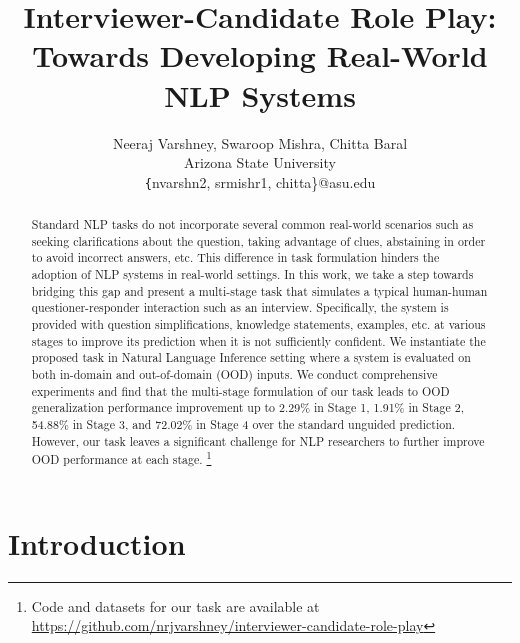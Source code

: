 \documentclass[11pt,a4paper]{article}
\title{Interviewer-Candidate Role Play: Towards Developing Real-World NLP Systems}
\author{
        Neeraj Varshney, 
        Swaroop Mishra, 
        Chitta Baral 
\\Arizona State University \\
    \texttt\{nvarshn2, srmishr1, chitta\}@asu.edu
}
\date{}
\providecommand{\Swaroop}[1]{
    {\protect\color{red}{[Swaroop: #1]}}
}
\begin{document}
\maketitle
\begin{abstract}

Standard NLP tasks do not incorporate several common real-world scenarios such as seeking clarifications about the question, taking advantage of clues, abstaining in order to avoid incorrect answers, etc. 
This difference in task formulation hinders the adoption of NLP systems in real-world settings.
In this work, we take a step towards bridging this gap and present a multi-stage task that simulates a typical human-human questioner-responder interaction such as an interview.
Specifically, the system is provided with question simplifications, knowledge statements, examples, etc. at various stages to improve its prediction when it is not sufficiently confident.
We instantiate the proposed task in Natural Language Inference setting where a system is evaluated on both in-domain and out-of-domain (OOD) inputs.
We conduct comprehensive experiments and find that the multi-stage formulation of our task leads to OOD generalization performance improvement up to 2.29\% in Stage 1, 1.91\% in Stage 2, 54.88\% in Stage 3, and 72.02\% in Stage 4 over the standard unguided prediction.
However, our task leaves a significant challenge for NLP researchers to further improve OOD performance at each stage.
\footnote{Code and datasets for our task are available at  \href{https://github.com/nrjvarshney/interviewer-candidate-role-play}{https://github.com/nrjvarshney/interviewer-candidate-role-play}}

\end{abstract}

\section{Introduction}
\label{introduction}
\end{document}

